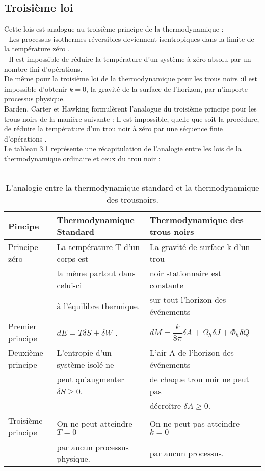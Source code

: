 \documentclass[12pt,  a4paper, openright]{report} %
\begin{document}
\subsection{Troisième loi}
Cette lois est analogue au troisième principe de la thermodynamique :\\
- Les processus isothermes réversibles deviennent isentropiques dans la limite de la
température zéro .\\
- Il est impossible de réduire la température d'un système à zéro absolu par un nombre
fini d'opérations.\\
De même pour la  troisième loi de la thermodynamique pour les trous noirs :il est impossible d'obtenir $k = 0$, la gravité de la surface de l'horizon, par n'importe processus physique.\\
Barden, Carter et Hawking formulèrent l'analogue du troisième principe pour les trous
noirs de la manière suivante : Il est impossible, quelle que soit la procédure, de réduire la
température d'un trou noir à zéro par une séquence finie d'opérations \cite{13,12,1}.\\
Le tableau 3.1 représente une récapitulation de l’analogie entre les lois de la thermodynamique ordinaire et ceux du trou noir :\\
\\
\begin{table}
	{ \renewcommand{\arraystretch}{1.4}
\begin{tabular}{|l|l|l|}
\hline
 Pincipe & Thermodynamique Standard  & Thermodynamique des trous noirs\\
 \hline
 Principe zéro & La température T d’un corps est &  La gravité de surface k d’un trou \\
            &             la même  partout  dans celui-ci &  noir stationnaire est constante  \\
             &              à l’équilibre thermique.  &  sur tout l’horizon des événements \\
\hline
Premier principe & $dE=T\delta S+ \delta W$ . & $dM=\dfrac{k}{8\pi}\delta A+\Omega_{h}\delta J+\Phi_{h}\delta Q$ \\
\hline
Deuxième principe & L'entropie d'un système isolé ne   & L'air A de l'horizon des événements \\
       &  peut qu'augmenter $\delta S \geq 0$.   &  de chaque trou noir ne peut pas  \\
         &     & décroître $\delta A\geq 0$.\\
\hline
Troisième principe & On ne peut atteindre $T = 0$ & On ne peut pas atteindre $k = 0$\\
               &      par aucun processus physique.   &  par aucun processus. \\
\hline
\end{tabular}}
\caption{L'analogie entre la thermodynamique standard et la thermodynamique des trousnoirs.}
\end{table}
\end{document}
